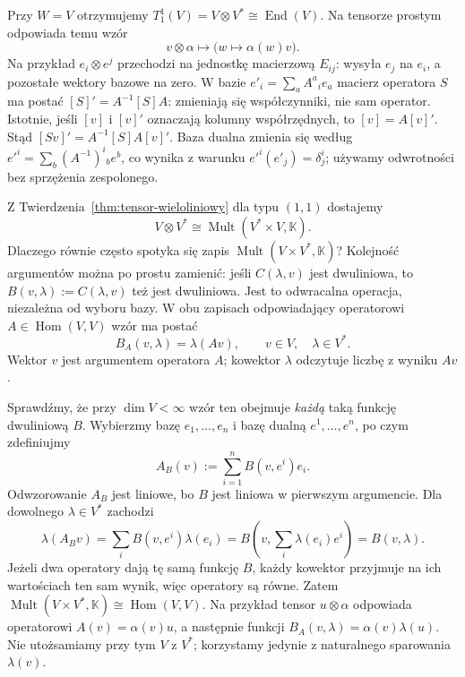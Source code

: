 Przy $W=V$ otrzymujemy
$T^1_1(V)=V\otimes V^*\cong\operatorname{End}(V)$.
Na tensorze prostym odpowiada temu wzór
\begin{equation}\label{eq:endo-tensor}
 v\otimes\alpha\longmapsto
 \bigl(w\longmapsto\alpha(w)v\bigr).
\end{equation}
Na przykład $e_i\otimes e^j$ przechodzi na jednostkę
macierzową $E_{ij}$: wysyła $e_j$ na $e_i$, a pozostałe
wektory bazowe na zero. W bazie $e'_i=\sum_a A^a{}_i e_a$
macierz operatora $S$ ma postać $[S]'=A^{-1}[S]A$:
zmieniają się współczynniki, nie sam operator.
Istotnie, jeśli $[v]$ i $[v]'$ oznaczają kolumny współrzędnych,
to $[v]=A[v]'$. Stąd $[Sv]'=A^{-1}[S]A[v]'$.
Baza dualna zmienia się według
$e'^i=\sum_b(A^{-1})^i{}_b e^b$, co wynika z warunku
$e'^i(e'_j)=\delta^i_j$; używamy odwrotności bez sprzężenia zespolonego.

\begin{uwaga}
\label{rem:mult-hom}
Z Twierdzenia~\ref{thm:tensor-wieloliniowy} dla typu $(1,1)$
dostajemy
\[
 V\otimes V^*\cong\operatorname{Mult}(V^*\times V,\mathbb K).
\]
Dlaczego równie często spotyka się zapis
$\operatorname{Mult}(V\times V^*,\mathbb K)$?
Kolejność argumentów można po prostu zamienić: jeśli
$C(\lambda,v)$ jest dwuliniowa, to $B(v,\lambda):=C(\lambda,v)$
też jest dwuliniowa. Jest to odwracalna operacja, niezależna
od wyboru bazy. W obu zapisach odpowiadający operatorowi
$A\in\operatorname{Hom}(V,V)$ wzór ma postać
\begin{equation}\label{eq:mult-operator}
 B_A(v,\lambda)=\lambda(Av),
 \qquad v\in V,\quad\lambda\in V^*.
\end{equation}
Wektor $v$ jest argumentem operatora $A$; kowektor
$\lambda$ odczytuje liczbę z wyniku $Av$.

Sprawdźmy, że przy $\dim V<\infty$ wzór ten obejmuje
\emph{każdą} taką funkcję dwuliniową $B$. Wybierzmy bazę
$e_1,\ldots,e_n$ i bazę dualną $e^1,\ldots,e^n$, po czym
zdefiniujmy
\[
 A_B(v):=\sum_{i=1}^n B(v,e^i)e_i.
\]
Odwzorowanie $A_B$ jest liniowe, bo $B$ jest liniowa w pierwszym
argumencie. Dla dowolnego $\lambda\in V^*$ zachodzi
\[
 \lambda(A_Bv)=\sum_i B(v,e^i)\lambda(e_i)
 =B\!\left(v,\sum_i\lambda(e_i)e^i\right)=B(v,\lambda).
\]
Jeżeli dwa operatory dają tę samą funkcję $B$, każdy kowektor
przyjmuje na ich wartościach ten sam wynik, więc operatory
są równe. Zatem
$\operatorname{Mult}(V\times V^*,\mathbb K)
 \cong\operatorname{Hom}(V,V)$.
Na przykład tensor $u\otimes\alpha$ odpowiada operatorowi
$A(v)=\alpha(v)u$, a następnie funkcji
$B_A(v,\lambda)=\alpha(v)\lambda(u)$.
Nie utożsamiamy przy tym $V$ z $V^*$; korzystamy jedynie
z naturalnego sparowania $\lambda(v)$.
\end{uwaga}

